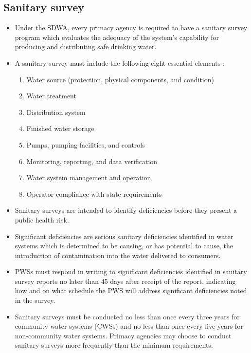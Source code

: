 \subsection{Sanitary survey} 
\begin{itemize}
\item Under the SDWA, every primacy agency is required to have a sanitary survey program which evaluates the adequacy of the system’s capability for producing and distributing safe drinking water.
\item A sanitary survey must include the following eight essential elements :
\begin{enumerate}
\item Water source (protection, physical components, and condition)
\item Water treatment
\item Distribution system
\item Finished water storage
\item Pumps, pumping facilities, and controls
\item Monitoring, reporting, and data verification
\item Water system management and operation
\item Operator compliance with state requirements
\end{enumerate}
\item Sanitary surveys are intended to identify deficiencies before they present a public health risk.

\item Significant deficiencies  are serious sanitary deficiencies identified in water systems which  is determined to be causing, or has potential to cause, the introduction of contamination into the water delivered to consumers.
\item PWSs must respond in writing to significant deficiencies identified in sanitary survey reports no later than 45 days after receipt of the report, indicating how and on what schedule the PWS will address significant deficiencies noted in the survey.   
\item Sanitary surveys must be conducted no less than once every three years for community water systems (CWSs) and no less than once every five years for non-community water systems. Primacy agencies may choose to conduct sanitary surveys more frequently than the minimum
requirements.
\end{itemize}

